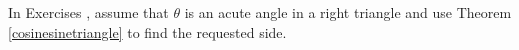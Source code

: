 {\noindent In Exercises}
{, assume that $\theta$ is an acute angle in a right triangle and use Theorem \ref{cosinesinetriangle} to find the requested side.}
